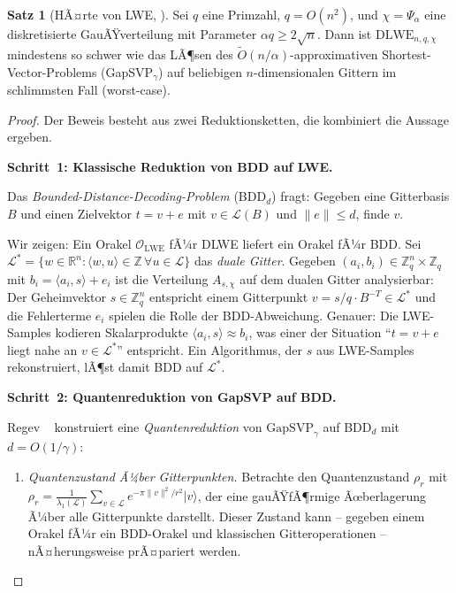 ﻿\documentclass[a4paper,12pt]{article}
\theoremstyle{definition}
\newtheorem{satz}{Satz}[section]
\begin{document}
\begin{satz}[HÃ¤rte von LWE, \cite{Reg05}]
\label{satz:lwe}
Sei $q$ eine Primzahl, $q = O(n^2)$, und $\chi = \Psi_\alpha$ eine diskretisierte
GauÃŸverteilung mit Parameter $\alpha q \geq 2\sqrt{n}$. Dann ist
$\mathrm{DLWE}_{n,q,\chi}$ mindestens so schwer wie das LÃ¶sen des
$\tilde{O}(n/\alpha)$-approximativen Shortest-Vector-Problems
(GapSVP$_\gamma$) auf beliebigen $n$-dimensionalen Gittern
im schlimmsten Fall (worst-case).
\end{satz}

\begin{proof}
Der Beweis besteht aus zwei Reduktionsketten, die kombiniert die Aussage ergeben.

\textbf{Schritt~1: Klassische Reduktion von BDD auf LWE.}

Das \emph{Bounded-Distance-Decoding-Problem} (BDD$_d$) fragt: Gegeben eine Gitterbasis
$B$ und einen Zielvektor $t = v + e$ mit $v \in \mathcal{L}(B)$ und
$\|e\| \leq d$, finde $v$.

Wir zeigen: Ein Orakel $\mathcal{O}_\mathrm{LWE}$ fÃ¼r DLWE liefert ein Orakel fÃ¼r BDD.
Sei $\mathcal{L}^* = \{w \in \mathbb{R}^n : \langle w, u \rangle \in \mathbb{Z}\,
\forall u \in \mathcal{L}\}$ das \emph{duale Gitter}. Gegeben
$(a_i, b_i) \in \mathbb{Z}_q^n \times \mathbb{Z}_q$ mit $b_i = \langle a_i, s \rangle + e_i$
ist die Verteilung $A_{s,\chi}$ auf dem dualen Gitter analysierbar:
Der Geheimvektor $s \in \mathbb{Z}_q^n$ entspricht einem Gitterpunkt
$v = s/q \cdot B^{-T} \in \mathcal{L}^*$ und die Fehlerterme $e_i$
spielen die Rolle der BDD-Abweichung. Genauer: Die LWE-Samples kodieren
Skalarprodukte $\langle a_i, s \rangle \approx b_i$, was einer der
Situation ``$t = v + e$ liegt nahe an $v \in \mathcal{L}^*$'' entspricht.
Ein Algorithmus, der $s$ aus LWE-Samples rekonstruiert, lÃ¶st damit BDD auf $\mathcal{L}^*$.

\textbf{Schritt~2: Quantenreduktion von GapSVP auf BDD.}

Regev ~\cite{Reg05} konstruiert eine \emph{Quantenreduktion}
von $\mathrm{GapSVP}_\gamma$ auf BDD$_d$ mit $d = O(1/\gamma)$:

\begin{enumerate}
\item[(a)] \emph{Quantenzustand Ã¼ber Gitterpunkten.}
Betrachte den Quantenzustand $\rho_r$ mit $\rho_r = \frac{1}{\lambda_1(\mathcal{L})}
\sum_{v \in \mathcal{L}} e^{-\pi \|v\|^2 / r^2} |v\rangle$, der eine gauÃŸfÃ¶rmige
Ãœberlagerung Ã¼ber alle Gitterpunkte darstellt. Dieser Zustand kann -- gegeben
einem Orakel fÃ¼r ein BDD-Orakel und klassischen Gitteroperationen --
nÃ¤herungsweise prÃ¤pariert werden.


\end{enumerate}
\end{proof}
\end{document}
